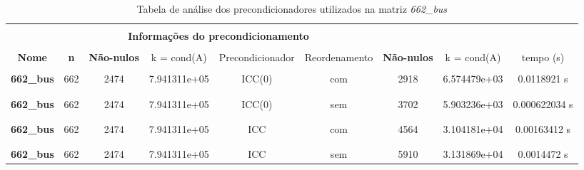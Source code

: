 
\begin{table}[ht]
    \centering
    \begin{tabular}{|c|c|c|c|c|c|c|c|c|}
        \hline \rowcolor{Gray}
        \multicolumn{9}{|c|}{\bfseries Tabela de analise dos precondicionadores }\\
        \hline \rowcolor{Gray}  \multicolumn{4}{|c|}{} & \multicolumn{5}{|c|}{} \\
         [-1em]  \rowcolor{Gray}
         \multicolumn{4}{|c|}{\bfseries Informações da matriz } & \multicolumn{5}{|c|}{\bfseries Informações do precondicionamento }\\
         \hline \rowcolor{Gray} & & & & & & & &  \\
         [-1em]
         \rowcolor{Gray}
         \bfseries Nome & \bfseries n & \bfseries Não-nulos &  
         k = cond(A) & Precondicionador & Reordenamento &
         \bfseries Não-nulos &  
         k = cond(A)  & tempo (s) \\
         \hline \\
         [-1em] \bfseries 662\_bus & 662 & 2474 & 7.941311e+05 & ICC(0) & com & 2918 & 6.574479e+03 & 0.0118921 s \\ & & & & & & & & \\ [-1em] \hline \\
         [-1em] \bfseries 662\_bus & 662 & 2474 & 7.941311e+05 & ICC(0) & sem & 3702 & 5.903236e+03 & 0.000622034 s \\ & & & & & & & & \\ [-1em] \hline \\
         [-1em] \bfseries 662\_bus & 662 & 2474 & 7.941311e+05 & ICC & com & 4564 & 3.104181e+04 & 0.00163412 s \\ & & & & & & & & \\ [-1em] \hline \\
         [-1em] \bfseries 662\_bus & 662 & 2474 & 7.941311e+05 & ICC & sem & 5910 & 3.131869e+04 & 0.0014472 s \\ \hline
    \end{tabular}
    \caption{Tabela de análise dos precondicionadores utilizados na matriz \textit{662\_bus}}
    \label{tab:precond-bus}
\end{table}


